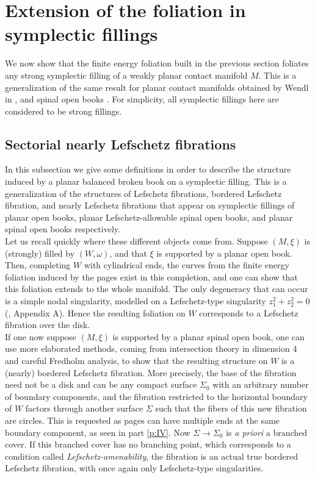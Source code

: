\documentclass[../main.tex]{subfiles}
\begin{document}
\section{Extension of the foliation in symplectic fillings}\label{p:V}

We now show that the finite energy foliation built in the previous section foliates any strong symplectic filling of a weakly planar contact manifold $M$. This is a generalization of the same result for planar contact manifolds obtained by Wendl in \cite{wendl_strongly_2010}, and spinal open books \cite{SOBD2}. For simplicity, all symplectic fillings here are considered to be strong fillings. \\

\subsection{Sectorial nearly Lefschetz fibrations}

In this subsection we give some definitions in order to describe the structure induced by a planar balanced broken book on a symplectic filling. This is  a generalization of the structures of Lefschetz fibrations, bordered Lefschetz fibration, and nearly Lefschetz fibrations that appear on symplectic fillings of planar open books, planar Lefschetz-allowable spinal open books, and planar spinal open books respectively.\\

Let us recall quickly where these different objects come from. Suppose $(M,\xi)$ is (strongly) filled by $(W,\omega)$, and that $\xi$ is supported by a planar open book. Then, completing $W$ with cylindrical ends, the curves from the finite energy foliation induced by the pages exist in this completion, and one can show that this foliation extends to the whole manifold. The only degeneracy that can occur is a simple nodal singularity, modelled on a Lefschetz-type singularity $z_1^2 + z_2 ^2 = 0$ (\cite{wendl_holomorphic_2018}, Appendix A). Hence the resulting foliation on $W$ corresponds to a Lefschetz fibration over the disk. \\

If one now suppose $(M,\xi)$ is supported by a planar spinal open book, one can use more elaborated methods, coming from intersection theory in dimension 4 and careful Fredholm analysis, to show that the resulting structure on $W$ is a (nearly) bordered Lefschetz fibration. More precisely, the base of the fibration need not be a disk and can be any compact surface $\Sigma_0$ with an arbitrary number of boundary components, and the fibration restricted to the horizontal boundary of $W$ factors through another surface $\Sigma$ such that the fibers of this new fibration are circles. This is requested as pages can have multiple ends at the same boundary component, as seen in part \ref{p:IV}. Now $\Sigma \rightarrow \Sigma_0$ is \textit{a priori} a branched cover. If this branched cover has no branching point, which corresponds to a condition called \textit{Lefschetz-amenability}, the fibration is an actual true bordered Lefschetz fibration, with once again only Lefschetz-type singularities.\\
\end{document}
